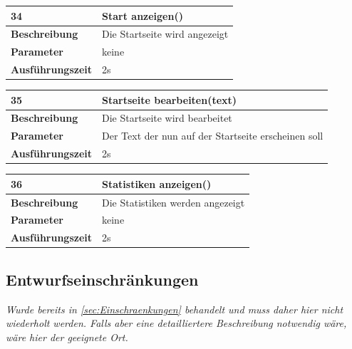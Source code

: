 \documentclass[fontsize=12pt,paper=a4,twoside]{scrartcl}
\begin{document}
  \begin{table}[htbp]
  \label{a34}
  \begin{tabular}{|l|p{10cm}|}
  \hline 
  \textbf{34} & \textbf{Start anzeigen()} \\ \hline
  \textbf{Beschreibung} & Die Startseite wird angezeigt\\ \hline
  \textbf{Parameter} & keine \\ \hline
  \textbf{Ausführungszeit} & 2s\\ \hline
  \end{tabular}
  \end{table}

  \begin{table}[htbp]
  \label{a35}
  \begin{tabular}{|l|p{10cm}|}
  \hline 
  \textbf{35} & \textbf{Startseite bearbeiten(text)} \\ \hline
  \textbf{Beschreibung} & Die Startseite wird bearbeitet\\ \hline
  \textbf{Parameter} & Der Text der nun auf der Startseite erscheinen soll \\ \hline
  \textbf{Ausführungszeit} & 2s\\ \hline
  \end{tabular}
  \end{table}

  \begin{table}[htbp]
  \label{a36}
  \begin{tabular}{|l|p{10cm}|}
  \hline 
  \textbf{36} & \textbf{Statistiken anzeigen()} \\ \hline
  \textbf{Beschreibung} & Die Statistiken werden angezeigt\\ \hline
  \textbf{Parameter} & keine \\ \hline
  \textbf{Ausführungszeit} & 2s\\ \hline
  \end{tabular}
  \end{table}
  
  \newpage
  
\subsection{Entwurfseinschränkungen}


{\em Wurde bereits in \ref{sec:Einschraenkungen} behandelt und muss
  daher hier nicht wiederholt werden. Falls aber eine detailliertere
  Beschreibung notwendig wäre, wäre hier der geeignete Ort.}
  
\end{document}
